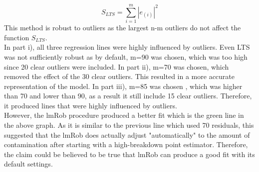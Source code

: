 \documentclass[a4paper,11pt]{article}
\begin{document}
\begin{enumerate}[i)]
\[
S_{LTS} = \sum^m_{i=1} |e_{(i)}|^2
\]
This method is robust to outliers as the largest n-m outliers do not affect the function $S_{LTS}$.\\
In part i), all three regression lines were highly influenced by outliers. Even LTS was not sufficiently robust as by default, m=90 was chosen, which was too high since 20 clear outliers were included. In part ii), m=70 was chosen, which removed the effect of the 30 clear outliers. This resulted in a more accurate representation of the model. In part iii), m=85 was chosen , which was higher than 70 and lower than 90, as a result it still include 15 clear outliers. Therefore, it produced lines that were highly influenced by outliers.\\
However, the lmRob procedure produced a better fit which is the green line in the above graph. As it is similar to the previous line which used 70 residuals, this suggested that the lmRob does actually adjust "automatically" to the amount of contamination after starting with a high-breakdown point estimator. Therefore, the claim could be believed to be true that lmRob can produce a good fit with its default settings.
\end{enumerate}
\newpage
\end{document}
